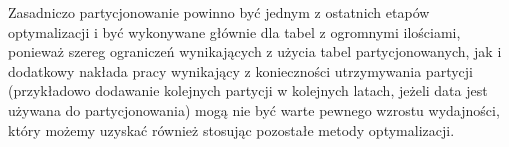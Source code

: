 Zasadniczo partycjonowanie powinno być jednym z ostatnich etapów optymalizacji i być wykonywane głównie dla tabel z ogromnymi ilościami, ponieważ szereg ograniczeń wynikających z użycia tabel partycjonowanych, jak i dodatkowy nakłada pracy wynikający z konieczności utrzymywania partycji (przykładowo dodawanie kolejnych partycji w kolejnych latach, jeżeli data jest używana do partycjonowania) mogą nie być warte pewnego wzrostu wydajności, który możemy uzyskać również stosując pozostałe metody optymalizacji.

